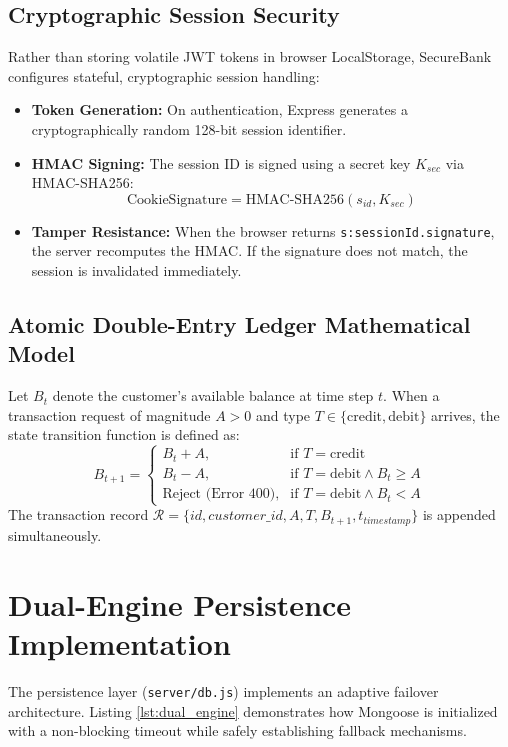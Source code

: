 \subsection{Cryptographic Session Security}
Rather than storing volatile JWT tokens in browser LocalStorage, SecureBank configures stateful, cryptographic session handling:
\begin{itemize}
    \item \textbf{Token Generation:} On authentication, Express generates a cryptographically random 128-bit session identifier.
    \item \textbf{HMAC Signing:} The session ID is signed using a secret key $K_{sec}$ via HMAC-SHA256:
    \begin{equation}
        \text{CookieSignature} = \text{HMAC-SHA256}(s_{id}, K_{sec})
    \end{equation}
    \item \textbf{Tamper Resistance:} When the browser returns \texttt{s:sessionId.signature}, the server recomputes the HMAC. If the signature does not match, the session is invalidated immediately.
\end{itemize}

\subsection{Atomic Double-Entry Ledger Mathematical Model}
Let $B_t$ denote the customer's available balance at time step $t$. When a transaction request of magnitude $A > 0$ and type $T \in \{\text{credit}, \text{debit}\}$ arrives, the state transition function is defined as:
\begin{equation}
B_{t+1} = 
\begin{cases} 
B_t + A, & \text{if } T = \text{credit} \\
B_t - A, & \text{if } T = \text{debit} \land B_t \ge A \\
\text{Reject (Error 400)}, & \text{if } T = \text{debit} \land B_t < A 
\end{cases}
\end{equation}
The transaction record $\mathcal{R} = \{id, customer\_id, A, T, B_{t+1}, t_{timestamp}\}$ is appended simultaneously.

\section{Dual-Engine Persistence Implementation}
The persistence layer (\texttt{server/db.js}) implements an adaptive failover architecture. Listing \ref{lst:dual_engine} demonstrates how Mongoose is initialized with a non-blocking timeout while safely establishing fallback mechanisms.

